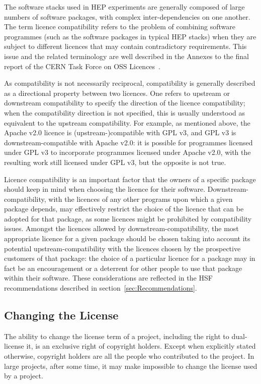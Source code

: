 \documentclass[12pt,a4paper]{article}
\begin{document}
The software stacks used in HEP experiments are generally composed of large numbers of software packages, with complex inter-dependencies on one another. The term licence compatibility refers to the problem of combining software programmes (such as the software packages in typical HEP stacks) when they are subject to different licences that may contain contradictory requirements. This issue and the related terminology are well described in the Annexes to the final report of the CERN Task Force on OSS Licences~\cite{[1]}. 

As compatibility is not necessarily reciprocal, compatibility is generally described as a directional property between two licences. One refers to upstream or downstream compatibility to specify the direction of the licence compatibility; when the compatibility direction is not specified, this is usually understood as equivalent to the upstream compatibility. For example, as mentioned above, the Apache v2.0 licence is (upstream-)compatible with GPL v3, and GPL v3 is downstream-compatible with Apache v2.0: it is possible for programmes licensed under GPL v3 to incorporate programmes licensed under Apache v2.0, with the resulting work still licensed under GPL v3, but the opposite is not true.

Licence compatibility is an important factor that the owners of a specific package should keep in mind when choosing the licence for their software. Downstream-compatibility, with the licences of any other programs upon which a given package depends, may effectively restrict the choice of the licence that can be adopted for that package, as some licences might be prohibited by compatibility issues. Amongst the licences allowed by downstream-compatibility, the most appropriate licence for a given package should be chosen taking into account its potential upstream-compatibility with the licences chosen by the prospective customers of that package: the choice of a particular licence for a package may in fact be an encouragement or a deterrent for other people to use that package within their software. These considerations are reflected in the HSF recommendations described in section~\ref{sec:Recommendations}.

\subsection{Changing the License}
\label{sec:LicenseChange}

The ability to change the license term of a project, including the right to dual-license it, is an exclusive right of copyright holders. Except when explicitly stated otherwise, copyright holders are all the people who contributed to the project. In large projects, after some time, it may make impossible to change the license used by a project.
\end{document}
